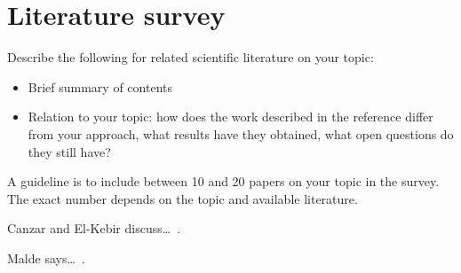 \chapter{Literature survey}

Describe the following for related scientific literature on your topic:
\begin{itemize}
\item Brief summary of contents
\item Relation to your topic: how does the work described in the reference differ from your approach, what results have they obtained, what open questions do they still have?
\end{itemize}

A guideline is to include between 10 and 20 papers on your topic in the survey. The exact number depends on the topic and available literature.


Canzar and El-Kebir discuss\ldots~\cite{canzar2012charge}.

Malde says\ldots~\cite{malde2011automated}.

\lipsum[19]
